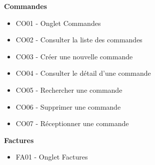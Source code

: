 \newpara
\textbf{Commandes}
\begin{itemize}
  \item \checkmark CO01 - Onglet Commandes
  \item \checkmark CO02 - Consulter la liste des commandes
  \item \checkmark CO03 - Créer une nouvelle commande
  \item \checkmark CO04 - Consulter le détail d'une commande
  \item \checkmark CO05 - Rechercher une commande
  \item \checkmark CO06 - Supprimer une commande
  \item \checkmark CO07 - Réceptionner une commande
\end{itemize}

\newpara
\textbf{Factures}
\begin{itemize}
  \item \checkmark FA01 - Onglet Factures
\end{itemize}